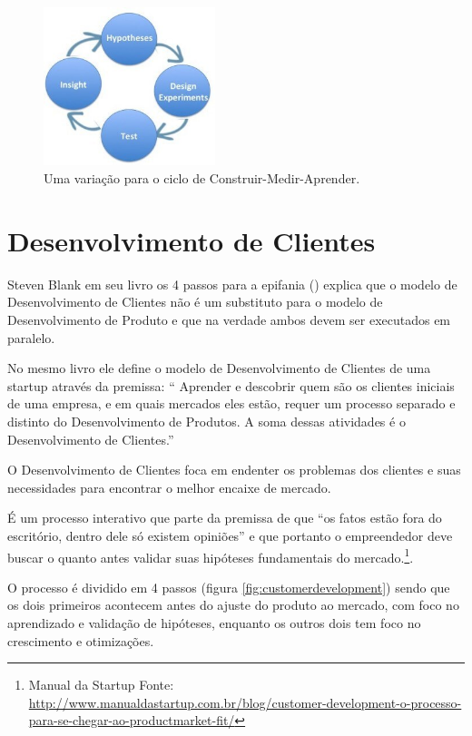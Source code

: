 \begin{figure}[htb]
\centering
\includegraphics[width=5cm]{figuras/hypotheses-experiment}
\caption{\label{fig:hypotheses-experiment} Uma variação para o ciclo de Construir-Medir-Aprender.}
\end{figure}

\section{Desenvolvimento de Clientes}
\par Steven Blank em seu livro os 4 passos para a epifania (\cite{blank:03}) explica que o modelo de Desenvolvimento de Clientes não é um substituto para o modelo de Desenvolvimento de Produto e que na verdade ambos devem ser executados em paralelo.
\par No mesmo livro ele define o modelo de Desenvolvimento de Clientes de uma startup através da premissa: “ Aprender e descobrir quem são os clientes iniciais de uma empresa, e em quais mercados eles estão, requer um processo separado e distinto do Desenvolvimento de Produtos. A soma dessas atividades é o Desenvolvimento de Clientes.”
\par O Desenvolvimento de Clientes foca em endenter os problemas dos clientes e suas necessidades para encontrar o melhor encaixe de mercado.
\par É um processo interativo que parte da premissa de que “os fatos estão fora do escritório, dentro dele só existem opiniões” e que portanto o empreendedor deve buscar o quanto antes validar suas hipóteses fundamentais do mercado.\footnote{Manual da Startup Fonte: \url{http://www.manualdastartup.com.br/blog/customer-development-o-processo-para-se-chegar-ao-productmarket-fit/}}.
\par O processo é dividido em 4 passos (figura \ref{fig:customerdevelopment}) sendo que os dois primeiros acontecem antes do ajuste do produto ao mercado, com foco no aprendizado e validação de hipóteses, enquanto os outros dois tem foco no crescimento e otimizações.
